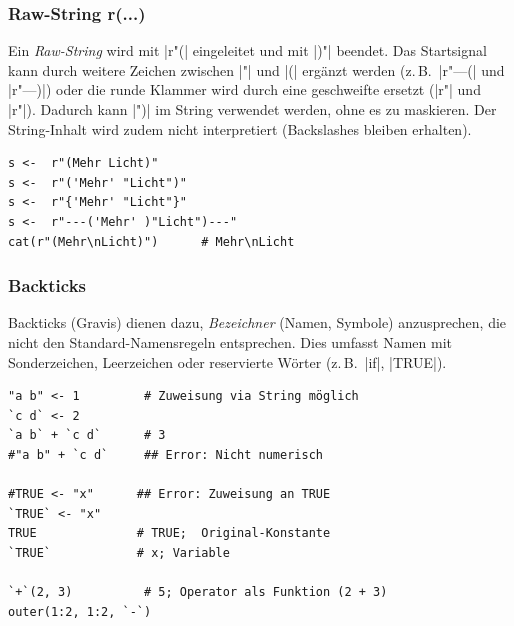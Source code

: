 \documentclass[10pt,twocolumn]{scrartcl}
\renewcommand{\lstinline}{\mycoloredinline}
\begin{document}
\subsubsection{Raw-String r\textquotedbl(...)\textquotedbl}

Ein \emph{Raw-String} wird mit \lstinline|r"(| eingeleitet und mit \lstinline|)"| beendet. Das Startsignal kann durch weitere Zeichen zwischen \lstinline|"| und \lstinline|(| ergänzt werden (z.\,B.\ \lstinline|r"---(| und \lstinline|r"---)|) oder die runde Klammer wird durch eine geschweifte ersetzt (\lstinline|r"{| und \lstinline|r"}|). Dadurch kann \lstinline|")| im String verwendet werden, ohne es zu maskieren. Der String-Inhalt wird zudem nicht interpretiert (Backslashes bleiben erhalten).

\begin{lstlisting}
s <-  r"(Mehr Licht)"
s <-  r"('Mehr' "Licht")"
s <-  r"{'Mehr' "Licht"}"
s <-  r"---('Mehr' )"Licht")---"
cat(r"(Mehr\nLicht)")      # Mehr\nLicht
\end{lstlisting}


\subsubsection{Backticks}

Backticks (Gravis) dienen dazu, \emph{Bezeichner} (Namen, Symbole) anzusprechen, die nicht den Standard-Namensregeln entsprechen. Dies umfasst Namen mit Sonderzeichen, Leerzeichen oder reservierte Wörter (z.\,B.\ \lstinline|if|, \lstinline|TRUE|).

\begin{lstlisting}
"a b" <- 1         # Zuweisung via String möglich
`c d` <- 2
`a b` + `c d`      # 3
#"a b" + `c d`     ## Error: Nicht numerisch

#TRUE <- "x"      ## Error: Zuweisung an TRUE
`TRUE` <- "x"
TRUE              # TRUE;  Original-Konstante
`TRUE`            # x; Variable

`+`(2, 3)          # 5; Operator als Funktion (2 + 3)
outer(1:2, 1:2, `-`)
\end{lstlisting}
\end{document}
